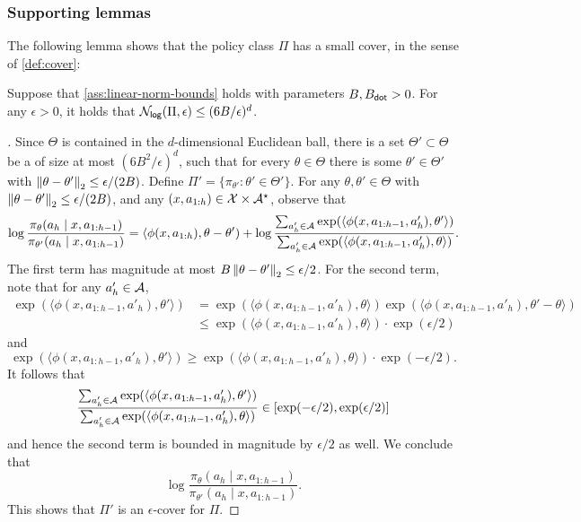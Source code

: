 \subsubsection{Supporting lemmas}


The following lemma shows that the policy class $\Pi$ has a small cover, in the sense of \cref{def:cover}:

\begin{lemma}\label{lemma:auto-linear-cover}
Suppose that \cref{ass:linear-norm-bounds} holds with parameters $B,B_{\mathsf{dot}}>0$. For any $\epsilon>0$, it holds that $\mathcal{N}_{\mathsf{log}}(\Pi,\epsilon) \leq (6B/\epsilon)^d$.
\end{lemma}

\begin{proof}[]
Since $\Theta$ is contained in the $d$-dimensional Euclidean ball, there is a set $\Theta' \subset \Theta$ be a of size at most $(6B^2/\epsilon)^d$, such that for every $\theta\in\Theta$ there is some $\theta' \in \Theta'$ with $\left \lVert \theta-\theta' \right \rVert_2 \leq \epsilon/(2B)$. Define $\Pi' = \{\pi_{\theta'}: \theta'\in\Theta'\}$. For any $\theta,\theta' \in \Theta$ with $\left \lVert \theta-\theta' \right \rVert_2 \leq \epsilon/(2B)$, and any $(x,a_{1:h})\in\mathcal{X}\times\mathcal{A}^\star$, observe that
\[\log\frac{\pi_\theta(a_h\mid{}x,a_{1:h-1})}{\pi_{\theta'}(a_h\mid{}x,a_{1:h-1})} = \langle \phi(x,a_{1:h}),\theta-\theta') + \log \frac{\sum_{a'_h\in\mathcal{A}} \exp(\langle \phi(x,a_{1:h-1},a'_h),\theta'\rangle)}{\sum_{a'_h\in\mathcal{A}} \exp(\langle \phi(x,a_{1:h-1},a'_h),\theta\rangle)}.\]
The first term has magnitude at most $B\left \lVert \theta-\theta' \right \rVert_2 \leq \epsilon/2$. For the second term, note that for any $a_h'\in\mathcal{A}$,
\begin{align}
\exp(\langle \phi(x,a_{1:h-1},a'_h),\theta'\rangle) 
&= \exp(\langle \phi(x,a_{1:h-1},a'_h),\theta\rangle)\exp(\langle \phi(x,a_{1:h-1},a'_h),\theta'-\theta\rangle) \\ 
&\leq \exp(\langle \phi(x,a_{1:h-1},a'_h),\theta\rangle) \cdot \exp(\epsilon/2)
\end{align}
and
\[\exp(\langle \phi(x,a_{1:h-1},a'_h),\theta'\rangle) \geq \exp(\langle \phi(x,a_{1:h-1},a'_h),\theta\rangle) \cdot \exp(-\epsilon/2).\]
It follows that 
\[\frac{\sum_{a'_h\in\mathcal{A}} \exp(\langle \phi(x,a_{1:h-1},a'_h),\theta'\rangle)}{\sum_{a'_h\in\mathcal{A}} \exp(\langle \phi(x,a_{1:h-1},a'_h),\theta\rangle)} \in [\exp(-\epsilon/2),\exp(\epsilon/2)]\]
and hence the second term is bounded  in magnitude by $\epsilon/2$ as well. We conclude that
\[\log\frac{\pi_\theta(a_h\mid{}x,a_{1:h-1})}{\pi_{\theta'}(a_h\mid{}x,a_{1:h-1})}.\]
This shows that $\Pi'$ is an $\epsilon$-cover for $\Pi$.
\end{proof}

